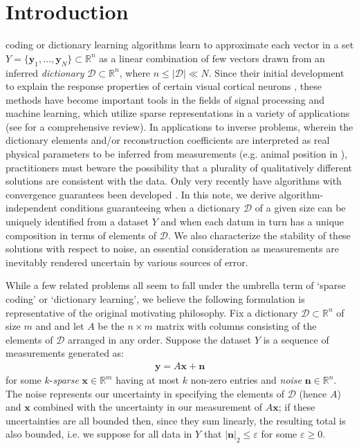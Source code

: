 \documentclass[journal, twocolumn]{IEEEtran}
\begin{document}
\section{Introduction}
 coding or dictionary learning algorithms learn to approximate each vector in a set $Y = \{\mathbf{y}_1, \ldots, \mathbf{y}_N\} \subset \mathbb{R}^n$ as a linear combination of few vectors drawn from an inferred \emph{dictionary} $\mathcal{D} \subset \mathbb{R}^n$, where $n \leq |\mathcal{D}| \ll N$. Since their initial development to explain the response properties of certain visual cortical neurons \cite{Olshausen96}, these methods have become important tools in the fields of signal processing and machine learning, which utilize sparse representations in a variety of applications (see \cite{Zhang15} for a comprehensive review). In applications to inverse problems, wherein the dictionary elements and/or reconstruction coefficients are interpreted as real physical parameters to be inferred from measurements (e.g. animal position in \cite{Agarwal14}), practitioners must beware the possibility that a plurality of qualitatively different solutions are consistent with the data. Only very recently have algorithms with convergence guarantees been developed \cite{??}. In this note, we derive algorithm-independent conditions guaranteeing when a dictionary $\mathcal{D}$ of a given size can be uniquely identified from a dataset $Y$ and when each datum in turn has a unique composition in terms of elements of $\mathcal{D}$. We also characterize the stability of these solutions with respect to noise, an essential consideration as measurements are inevitably rendered uncertain by various sources of error. 

While a few related problems all seem to fall under the umbrella term of `sparse coding' or `dictionary learning', we believe the following formulation is representative of the original motivating philosophy. Fix a dictionary $\mathcal{D} \subset \mathbb{R}^n$ of size $m$ and and let $A$ be the $n \times m$ matrix with columns consisting of the elements of $\mathcal{D}$ arranged in any order. Suppose the dataset $Y$ is a sequence of measurements generated as:
\begin{align}\label{LinearModel}
\mathbf{y} = A\mathbf{x} + \mathbf{n}
\end{align}
%
for some $k$-\emph{sparse} $\mathbf{x} \in \mathbb{R}^m$ having at most $k$ non-zero entries and \emph{noise} $\mathbf{n} \in \mathbb{R}^n$. The noise represents our uncertainty in specifying the elements of $\mathcal{D}$ (hence $A$) and $\mathbf{x}$ combined with the uncertainty in our measurement of $A\mathbf{x}$; if these uncertainties are all bounded then, since they sum linearly, the resulting total is also bounded, i.e. we suppose for all data in $Y$ that $|\mathbf{n}|_2 \leq \varepsilon$ for some $\varepsilon \geq 0$. 
\end{document}
